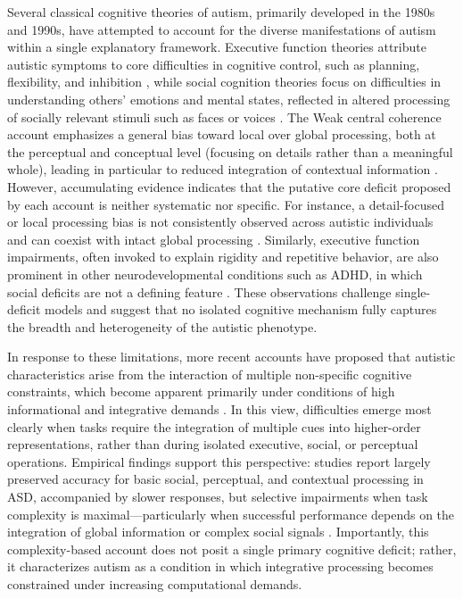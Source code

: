 \documentclass{article}
\begin{document}
Several classical cognitive theories of autism, primarily developed in the 1980s and 1990s, have attempted to account for the diverse manifestations of autism within a single explanatory framework. Executive function theories attribute autistic symptoms to core difficulties in cognitive control, such as planning, flexibility, and inhibition \citep{Hill2004}, while social cognition theories focus on difficulties in understanding others’ emotions and mental states, reflected in altered processing of socially relevant stimuli such as faces or voices \citep{Frith1989}. The Weak central coherence account emphasizes a general bias toward local over global processing, both at the perceptual and conceptual level (focusing on details rather than a meaningful whole), leading in particular to reduced integration of contextual information \citep{Frith1989}. However, accumulating evidence indicates that the putative core deficit proposed by each account is neither systematic nor specific. For instance, a detail-focused or local processing bias is not consistently observed across autistic individuals and can coexist with intact global processing \citep{Mottron2006}. Similarly, executive function impairments, often invoked to explain rigidity and repetitive behavior, are also prominent in other neurodevelopmental conditions such as ADHD, in which social deficits are not a defining feature \citep{Booth2011}. These observations challenge single-deficit models and suggest that no isolated cognitive mechanism fully captures the breadth and heterogeneity of the autistic phenotype.

In response to these limitations, more recent accounts have proposed that autistic characteristics arise from the interaction of multiple non-specific cognitive constraints, which become apparent primarily under conditions of high informational and integrative demands \citep{Benyosef2017}. In this view, difficulties emerge most clearly when tasks require the integration of multiple cues into higher-order representations, rather than during isolated executive, social, or perceptual operations. Empirical findings support this perspective: studies report largely preserved accuracy for basic social, perceptual, and contextual processing in ASD, accompanied by slower responses, but selective impairments when task complexity is maximal—particularly when successful performance depends on the integration of global information or complex social signals \citep{Benyosef2017}. Importantly, this complexity-based account does not posit a single primary cognitive deficit; rather, it characterizes autism as a condition in which integrative processing becomes constrained under increasing computational demands.
\end{document}
